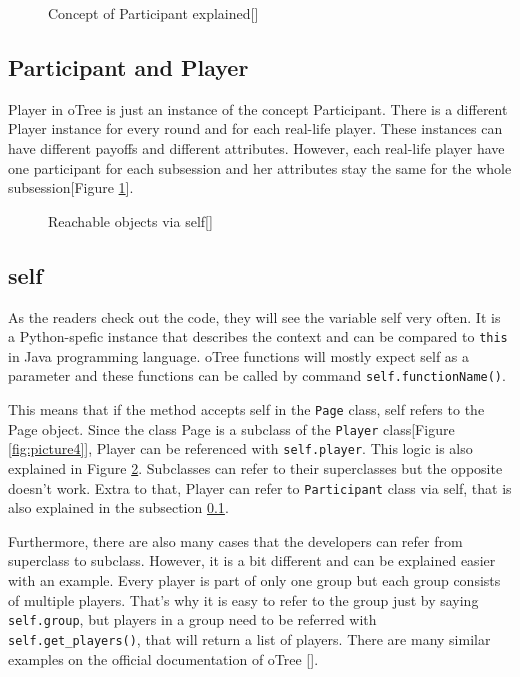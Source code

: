 \begin{figure}[h]
	\centerline{}
	\caption{Concept of Participant explained[\cite{oTreeConcepts2017}]}
	\label{fig:picture5}
	
\end{figure}

\subsection{Participant and Player}\label{sub:participant}

Player in oTree is just an instance of the concept Participant. There is a different Player instance for every round and for each real-life player. These instances can have different payoffs and different attributes. However, each real-life player have one participant for each subsession and her attributes stay the same for the whole subsession[Figure \ref{fig:picture5}].

\begin{figure}[h]
	\centerline{}
	\caption{Reachable objects via self[\cite{oTreeConcepts2017}]}
	\label{fig:picture6}
	
\end{figure}

\subsection{self}

As the readers check out the code, they will see the variable self very often. It is a Python-spefic instance that describes the context and can be compared to \verb|this| in Java programming language. oTree functions will mostly expect self as a parameter and these functions can be called by command \verb|self.functionName()|.

This means that if the method accepts self in the \verb|Page| class, self refers to the Page object. Since the class Page is a subclass of the \verb|Player| class[Figure \ref{fig:picture4}],  Player can be referenced with \verb|self.player|. This logic is also explained in Figure \ref{fig:picture6}. Subclasses can refer to their superclasses but the opposite doesn't work. Extra to that, Player can refer to \verb|Participant| class via self, that is also explained in the subsection \ref{sub:participant}. 

Furthermore, there are also many cases that the developers can refer from superclass to subclass. However, it is a bit different and can be explained easier with an example. Every player is part of only one group but each group consists of multiple players. That's why it is easy to refer to the group just by saying \verb|self.group|, but players in a group need to be referred with \verb|self.get_players()|, that will return a list of players. There are many similar examples on the official documentation of oTree [\cite{oTreeConcepts2017}]. 

